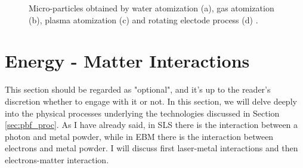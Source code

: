 \begin{figure}
{    }
    \qquad
    
    \caption[Powders from atomization processes]{Micro-particles obtained by water atomization (a), gas atomization (b), plasma atomization (c) and rotating electode process (d) \cite{slotwinski_characterization_2014}.}
    \label{fig:powders}
\end{figure}


\section{Energy - Matter Interactions}
\label{sec:matterint}
This section should be regarded as "optional", and it's up to the reader's discretion whether to engage with it or not. In this section, we will delve deeply into the physical processes underlying the technologies discussed in Section \ref{sec:pbf_proc}. As I have already said, in SLS there is the interaction between a photon and metal powder, while in EBM there is the interaction between electrons and metal powder. I will discuss first laser-metal interactions and then electrons-matter interaction.
